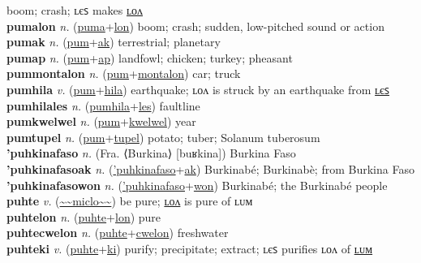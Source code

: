 boom; crash; ʟєꜱ makes \hyperref[pumalon]{ʟᴏᴧ} \label{puma} \\
\textbf{pumalon} \textit{n.} (\hyperref[puma]{puma}+\hyperref[lon]{lon})
boom; crash; sudden, low-pitched sound or action \label{pumalon} \\
\textbf{pumak} \textit{n.} (\hyperref[pum]{pum}+\hyperref[ak]{ak})
terrestrial; planetary \label{pumak} \\
\textbf{pumap} \textit{n.} (\hyperref[pum]{pum}+\hyperref[ap]{ap})
landfowl; chicken; turkey; pheasant \label{pumap} \\
\textbf{pummontalon} \textit{n.} (\hyperref[pum]{pum}+\hyperref[montalon]{montalon})
car; truck \label{pummontalon} \\
\textbf{pumhila} \textit{v.} (\hyperref[pum]{pum}+\hyperref[hila]{hila})
earthquake; ʟᴏᴧ is struck by an earthquake from \hyperref[pumhilales]{ʟєꜱ} \label{pumhila} \\
\textbf{pumhilales} \textit{n.} (\hyperref[pumhila]{pumhila}+\hyperref[les]{les})
faultline \label{pumhilales} \\
\textbf{pumkwelwel} \textit{n.} (\hyperref[pum]{pum}+\hyperref[kwelwel]{kwelwel})
year \label{pumkwelwel} \\
\textbf{pumtupel} \textit{n.} (\hyperref[pum]{pum}+\hyperref[tupel]{tupel})
potato; tuber; Solanum tuberosum \label{pumtupel} \\
\textbf{'puhkinafaso} \textit{n.} (Fra. ⟨Burkina⟩ [buʁkina])
Burkina Faso \label{'puhkinafaso} \\
\textbf{'puhkinafasoak} \textit{n.} (\hyperref['puhkinafaso]{'puhkinafaso}+\hyperref[ak]{ak})
Burkinabé; Burkinabè; from Burkina Faso \label{'puhkinafasoak} \\
\textbf{'puhkinafasowon} \textit{n.} (\hyperref['puhkinafaso]{'puhkinafaso}+\hyperref[won]{won})
Burkinabé; the Burkinabé people \label{'puhkinafasowon} \\
\textbf{puhte} \textit{v.} (\hyperref[miclo]{\~{}\~{}miclo\~{}\~{}})
be pure; \hyperref[puhtelon]{ʟᴏᴧ} is pure of ʟᴜᴍ \label{puhte} \\
\textbf{puhtelon} \textit{n.} (\hyperref[puhte]{puhte}+\hyperref[lon]{lon})
pure \label{puhtelon} \\
\textbf{puhtecwelon} \textit{n.} (\hyperref[puhte]{puhte}+\hyperref[cwelon]{cwelon})
freshwater \label{puhtecwelon} \\
\textbf{puhteki} \textit{v.} (\hyperref[puhte]{puhte}+\hyperref[ki]{ki})
purify; precipitate; extract; ʟєꜱ purifies ʟᴏᴧ of \hyperref[puhtekilum]{ʟᴜᴍ} \label{puhteki} \\
